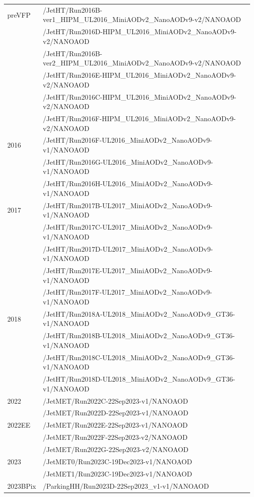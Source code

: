 \documentclass[twoside]{article}
\begin{document}
\begin{longtable}{|l|l|}
    \hline
    \endlastfoot
    2016 preVFP & /JetHT/Run2016B-ver1\_HIPM\_UL2016\_MiniAODv2\_NanoAODv9-v2/NANOAOD \\
                 & /JetHT/Run2016D-HIPM\_UL2016\_MiniAODv2\_NanoAODv9-v2/NANOAOD \\
                 & /JetHT/Run2016B-ver2\_HIPM\_UL2016\_MiniAODv2\_NanoAODv9-v2/NANOAOD \\
                 & /JetHT/Run2016E-HIPM\_UL2016\_MiniAODv2\_NanoAODv9-v2/NANOAOD \\
                 & /JetHT/Run2016C-HIPM\_UL2016\_MiniAODv2\_NanoAODv9-v2/NANOAOD \\
                 & /JetHT/Run2016F-HIPM\_UL2016\_MiniAODv2\_NanoAODv9-v2/NANOAOD \\
    \hline
    2016 & /JetHT/Run2016F-UL2016\_MiniAODv2\_NanoAODv9-v1/NANOAOD \\
         & /JetHT/Run2016G-UL2016\_MiniAODv2\_NanoAODv9-v1/NANOAOD \\
         & /JetHT/Run2016H-UL2016\_MiniAODv2\_NanoAODv9-v1/NANOAOD \\
    \hline
    2017 & /JetHT/Run2017B-UL2017\_MiniAODv2\_NanoAODv9-v1/NANOAOD \\
         & /JetHT/Run2017C-UL2017\_MiniAODv2\_NanoAODv9-v1/NANOAOD \\
         & /JetHT/Run2017D-UL2017\_MiniAODv2\_NanoAODv9-v1/NANOAOD \\
         & /JetHT/Run2017E-UL2017\_MiniAODv2\_NanoAODv9-v1/NANOAOD \\
         & /JetHT/Run2017F-UL2017\_MiniAODv2\_NanoAODv9-v1/NANOAOD \\
    \hline
    2018 & /JetHT/Run2018A-UL2018\_MiniAODv2\_NanoAODv9\_GT36-v1/NANOAOD \\
         & /JetHT/Run2018B-UL2018\_MiniAODv2\_NanoAODv9\_GT36-v1/NANOAOD \\
         & /JetHT/Run2018C-UL2018\_MiniAODv2\_NanoAODv9\_GT36-v1/NANOAOD \\
         & /JetHT/Run2018D-UL2018\_MiniAODv2\_NanoAODv9\_GT36-v1/NANOAOD \\
    \hline
    2022 & /JetMET/Run2022C-22Sep2023-v1/NANOAOD \\
         & /JetMET/Run2022D-22Sep2023-v1/NANOAOD \\
    \hline
    2022EE & /JetMET/Run2022E-22Sep2023-v1/NANOAOD \\
           & /JetMET/Run2022F-22Sep2023-v2/NANOAOD \\
           & /JetMET/Run2022G-22Sep2023-v2/NANOAOD \\
    \hline
    2023 & /JetMET0/Run2023C-19Dec2023-v1/NANOAOD \\
         & /JetMET1/Run2023C-19Dec2023-v1/NANOAOD \\
    \hline
    2023BPix & /ParkingHH/Run2023D-22Sep2023\_v1-v1/NANOAOD \\
    \hline
\end{longtable}
\end{document}
